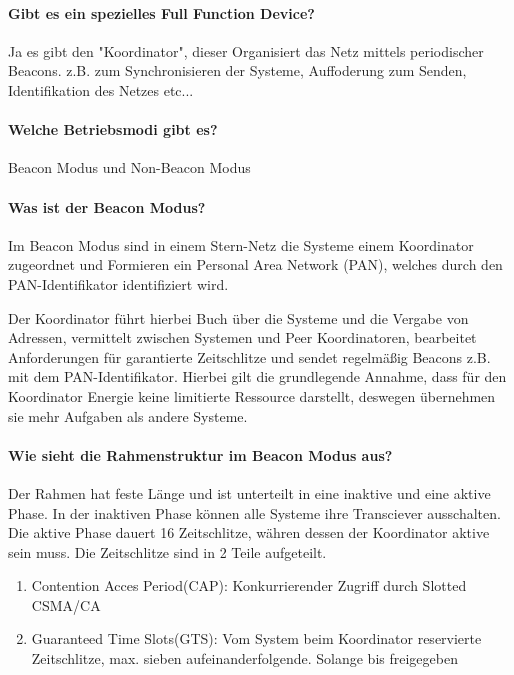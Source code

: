	\paragraph{Gibt es ein spezielles Full Function Device?}
	Ja es gibt den "Koordinator", dieser Organisiert das Netz mittels periodischer Beacons. z.B. zum Synchronisieren der Systeme, Auffoderung zum Senden, Identifikation des Netzes etc...
	
	\paragraph{Welche Betriebsmodi gibt es?}
	Beacon Modus und Non-Beacon Modus
	
	\paragraph{Was ist der Beacon Modus?}
	Im Beacon Modus sind in einem Stern-Netz die Systeme einem Koordinator zugeordnet und Formieren ein Personal Area Network (PAN), welches durch den PAN-Identifikator identifiziert wird.
	
	Der Koordinator führt hierbei Buch über die Systeme und die Vergabe von Adressen, vermittelt zwischen Systemen und Peer Koordinatoren, bearbeitet Anforderungen für garantierte Zeitschlitze und sendet regelmäßig Beacons z.B. mit dem PAN-Identifikator.
	Hierbei gilt die grundlegende Annahme, dass für den Koordinator Energie keine limitierte Ressource darstellt, deswegen übernehmen sie mehr Aufgaben als andere Systeme.
	
	\paragraph{Wie sieht die Rahmenstruktur im Beacon Modus aus?}
	Der Rahmen hat feste Länge und ist unterteilt in eine inaktive und eine aktive Phase. In der inaktiven Phase können alle Systeme ihre Transciever ausschalten. Die aktive Phase dauert 16 Zeitschlitze, währen dessen der Koordinator aktive sein muss. 
	Die Zeitschlitze sind in 2 Teile aufgeteilt.
	\begin{enumerate}
		\item Contention Acces Period(CAP): Konkurrierender Zugriff durch Slotted CSMA/CA
		\item Guaranteed Time Slots(GTS): Vom System beim Koordinator reservierte Zeitschlitze, max. sieben aufeinanderfolgende. Solange bis freigegeben
	\end{enumerate}

